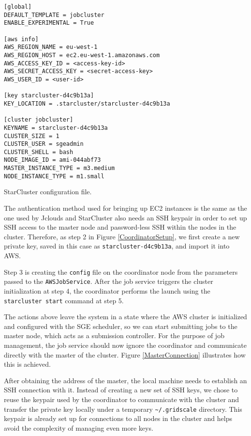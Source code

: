 \begin{listing}[h]
	\centering
	\begin{minipage}{9.4cm}
		\begin{verbatim}
[global]
DEFAULT_TEMPLATE = jobcluster
ENABLE_EXPERIMENTAL = True

[aws info]
AWS_REGION_NAME = eu-west-1
AWS_REGION_HOST = ec2.eu-west-1.amazonaws.com
AWS_ACCESS_KEY_ID = <access-key-id>
AWS_SECRET_ACCESS_KEY = <secret-access-key>
AWS_USER_ID = <user-id>

[key starcluster-d4c9b13a]
KEY_LOCATION = .starcluster/starcluster-d4c9b13a

[cluster jobcluster]
KEYNAME = starcluster-d4c9b13a
CLUSTER_SIZE = 1
CLUSTER_USER = sgeadmin
CLUSTER_SHELL = bash
NODE_IMAGE_ID = ami-044abf73
MASTER_INSTANCE_TYPE = m3.medium
NODE_INSTANCE_TYPE = m1.small
		\end{verbatim}
	\end{minipage}
	\caption{StarCluster configuration file.}
	\label{StarClusterConfig}
\end{listing}


The authentication method used for bringing up EC2 instances is the same as the one used by Jclouds and StarCluster also needs an SSH keypair in order to set up SSH access to the master node and password-less SSH within the nodes in the cluster. Therefore, as step 2 in Figure \ref{CoordinatorSetup}, we first create a new private key, saved in this case as \verb|starcluster-d4c9b13a|, and import it into AWS.

Step 3 is creating the \verb|config| file on the coordinator node from the parameters passed to the \verb|AWSJobService|. After the job service triggers the cluster initialization at step 4, the coordinator performs the launch using the \verb|starcluster start| command at step 5.

The actions above leave the system in a state where the AWS cluster is initialized and configured with the SGE scheduler, so we can start submitting jobs to the master node, which acts as a submission controller. For the purpose of job management, the job service should now ignore the coordinator and communicate directly with the master of the cluster. Figure \ref{MasterConnection} illustrates how this is achieved.

After obtaining the address of the master, the local machine needs to establish an SSH connection with it. Instead of creating a new set of SSH keys, we chose to reuse the keypair used by the coordinator to communicate with the cluster and transfer the private key locally under a temporary \verb|~/.gridscale| directory. This keypair is already set up for connections to all nodes in the cluster and helps avoid the complexity of managing even more keys.

